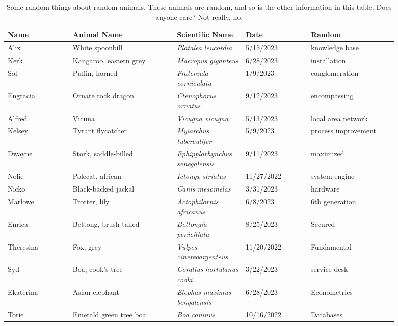 \begin{landscape}
\begin{table}[t]

	\caption[Some random things about random animals]{Some random things about random animals. These animals are random, and so is the other information in this table. Does anyone care? Not really, no.}
	
	\label{tbl:animals}		
	\begin{center}
	\begin{tabular}{L{0.15\linewidth} L{0.24\linewidth} L{0.15\linewidth} L{0.15\linewidth} L{0.2\linewidth}}
			\toprule
			\textbf{Name} & \textbf{Animal Name}& \textbf{Scientific Name }& \textbf{Date} & \textbf{Random} \\
			\hline
			Alix & White spoonbill & \textit{Platalea leucordia} & 5/15/2023 & knowledge base \\
			\hline
			Kerk & Kangaroo, eastern grey & \textit{Macropus giganteus} & 6/28/2023 & installation \\
			\hline
			Sol & Puffin, horned & \textit{Fratercula corniculata} & 1/9/2023 & conglomeration \\
			\hline
			Engracia & Ornate rock dragon & \textit{Ctenophorus ornatus} & 9/12/2023 & encompassing \\
			\hline
			Alfred & Vicuna & \textit{Vicugna vicugna} & 5/13/2023 & local area network \\
			\hline
			Kelsey & Tyrant flycatcher & \textit{Myiarchus tuberculifer} & 5/9/2023 & process improvement \\
			\hline
			Dwayne & Stork, saddle-billed & \textit{Ephipplorhynchus senegalensis} & 9/11/2023 & maximized \\
			\hline
			Nolie & Polecat, african & \textit{Ictonyx striatus} & 11/27/2022 & system engine \\
			\hline
			Nicko & Black-backed jackal & \textit{Canis mesomelas }& 3/31/2023 & hardware \\
			\hline
			Marlowe & Trotter, lily & \textit{Actophilornis africanus} & 6/8/2023 & 6th generation \\
			\hline
			Enrica & Bettong, brush-tailed & \textit{Bettongia penicillata }& 8/25/2023 & Secured \\
			\hline
			Theresina & Fox, grey & \textit{Vulpes cinereoargenteus }& 11/20/2022 & Fundamental \\
			\hline
			Syd & Boa, cook's tree & \textit{Corallus hortulanus cooki }& 3/22/2023 & service-desk \\
			\hline
			Ekaterina & Asian elephant & \textit{Elephas maximus bengalensis} & 6/28/2023 & Econometrics \\
			\hline
			Torie & Emerald green tree boa & \textit{Boa caninus} & 10/16/2022 & Databases \\
						\bottomrule
		\end{tabular}
\end{center}
\end{table}
\end{landscape}

